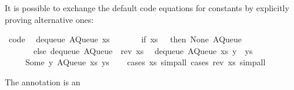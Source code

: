 \begin{isabellebody}
\begin{isamarkuptext}
  It is possible to exchange the default code equations for constants
  by explicitly proving alternative ones:%
\end{isamarkuptext}%
\isamarkuptrue%
%
\isadelimquote
%
\endisadelimquote
%
\isatagquote
{}\isamarkupfalse%
\ {}code{}{}\isanewline
\ \ {}dequeue\ {}AQueue\ xs\ {}{}{}\ {}\isanewline
\ \ \ \ \ {}if\ xs\ {}\ {}{}\ then\ {}None{}\ AQueue\ {}{}\ {}{}{}\isanewline
\ \ \ \ \ \ \ else\ dequeue\ {}AQueue\ {}{}\ {}rev\ xs{}{}{}{}\isanewline
\ \ {}dequeue\ {}AQueue\ xs\ {}y\ {}\ ys{}{}\ {}\isanewline
\ \ \ \ \ {}Some\ y{}\ AQueue\ xs\ ys{}{}\isanewline
\ \ \isamarkupfalse%
\ {}cases\ xs{}\ simp{}all{}\ {}cases\ {}rev\ xs{}{}\ simp{}all{}%
\endisatagquote
{\isafoldquote}%
%
\isadelimquote
%
\endisadelimquote
%
\begin{isamarkuptext}%
\noindent The annotation  is an 

\end{isamarkuptext}
\end{isabellebody}
